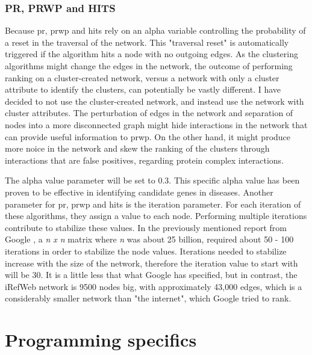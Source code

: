 \subsection{PR, PRWP and HITS}
Because \gls{pr}, \gls{prwp} and \gls{hits} rely on an alpha variable
controlling the probability of a reset in the traversal of the network. This
"traversal reset" is automatically triggered if the algorithm hits a node with
no outgoing edges. As the clustering algorithms might change the edges in the
network, the outcome of performing ranking on a cluster-created network, versus
a network with only a cluster attribute to identify the clusters, can
potentially be vastly different. I have decided to not use the cluster-created
network, and instead use the network with cluster attributes. The perturbation
of edges in the network and separation of nodes into a more disconnected graph
might hide interactions in the network that can provide useful information to
\gls{prwp}. On the other hand, it might produce more noice in the network and
skew the ranking of the clusters through interactions that are false positives,
regarding protein complex interactions. 

The alpha value parameter will be set to 0.3. This specific alpha value has been
proven to be effective in identifying candidate genes in
diseases\cite{disease-prwp}. Another parameter for \gls{pr}, \gls{prwp} and
\gls{hits} is the iteration parameter. For each iteration of these algorithms,
they assign a value to each node. Performing multiple iterations contribute to
stabilize these values. In the previously mentioned report from Google
\cite{pr-parameters}, a \textit{n x n} matrix where \textit{n} was about 25
billion, required about 50 - 100 iterations in order to stabilize the node
values. Iterations needed to stabilize increase with the size of the network,
therefore the iteration value to start with will be 30. It is a little less that
what Google has specified, but in contrast, the iRefWeb network is 9500 nodes
big, with approximately 43,000 edges, which is a considerably smaller network
than "the internet", which Google tried to rank.

\chapter{Programming specifics}
